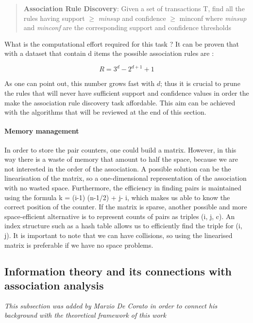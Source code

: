 \documentclass[12pt,%
               a4paper,%
               oneside,openany,%
               titlepage,%
               headinclude,footinclude,%
               BCOR5mm,%
               cleardoublepage=empty,%
               tablecaptionabove,%
               floatperchapter,
               ]{scrreprt}                 %
\begin{document}
\begin{quote}
\textbf{Association Rule Discovery}: Given a set of transactions T, find all the rules having support $\ge$ \textit{minsup} and confidence $\ge$ minconf where \textit{minsup} and \textit{minconf} are the corresponding support and confidence thresholds
\end{quote}

What is the computational effort required for this task ? It can be proven that with a dataset that contain d items the possible association rules are \cite{tan2019introduction}:

\begin{equation}
R=3^{d}-2^{d+1}+1
\end{equation}

As one can point out, this number grows fast with $d$; thus it is crucial to prune the rules that will never have sufficient support and confidence values in order the make the association rule discovery task affordable. This aim can be achieved with the algorithms that will be reviewed at the end of this section.

\paragraph{Memory management}

In order to store the pair counters, one could build a matrix. However, in this way there is a waste of memory that amount to half the space, because we are not interested in the order of the association.
A possible solution can be the linearisation of the matrix, so a one-dimensional representation of the association with no wasted space. Furthermore, the efficiency in finding pairs is maintained using the formula k = (i-1) (n-1/2) + j- i, which makes us able to know the correct position of the counter.
If the matrix is sparse, another possible and more space-efficient alternative is to represent counts of pairs as triples (i, j, c). An index structure such as a hash table allows us to efficiently find the triple for (i, j). It is important to note that we can have collisions, so using the linearised matrix is preferable if we have no space problems.


\subsection{Information theory and its connections with association analysis}

\textit{This subsection was added by Marzio De Corato in order to connect his background with the theoretical framework of this work} \\
\end{document}
